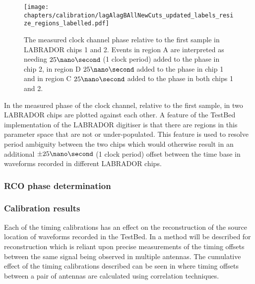 \begin{figure}[htpb]
  \texttt{[image: chapters/calibration/lagAlagBAllNewCuts\_updated\_labels\_resize\_regions\_labelled.pdf]}
  \caption{The measured clock channel phase relative to the first sample in LABRADOR chips 1 and 2. Events in region A are interpreted as needing $25 \nano \second$ (1 clock period) added to the phase in chip 2, in region D $25 \nano \second$ added to the phase in chip 1 and in region C $25 \nano \second$ added to the phase in both chips 1 and 2.}
  \label{fig:calibration:LABRADOR-Digitiser-Chip:Swiss-flag}
\end{figure}

In  the measured phase of the clock channel, relative to the first sample, in two LABRADOR chips are plotted against each other. A feature of the TestBed implementation of the LABRADOR digitiser is that there are regions in this parameter space that are not or under-populated. This feature is used to resolve period ambiguity between the two chips which would otherwise result in an additional $\pm 25 \nano \second$ (1 clock period) offset between the time base in waveforms recorded in different LABRADOR chips.

\subsubsection{RCO phase determination}
\label{sec:calibration:LABRADOR-Digitiser-Chip:RCO-phase-determination}






\subsubsection{Calibration results}
\label{sec:calibration:LABRADOR-Digitiser-Chip:Calibration-results}

Each of the timing calibrations has an effect on the reconstruction of the source location of waveforms recorded in the TestBed. In  a method will be described for reconstruction which is reliant upon precise measurements of the timing offsets between the same signal being observed in multiple antennas. The cumulative effect of the timing calibrations described can be seen in  where timing offsets between a pair of antennas are calculated using correlation techniques.

